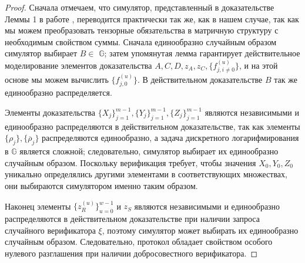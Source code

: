 \documentclass{article}
\theoremstyle{definition}
\begin{document}
\begin{proof}
Сначала отмечаем, что симулятор, представленный в доказательстве Леммы 1 в работе \cite{bootle}, переводится практически так же, как в нашем случае, так как мы можем преобразовать тензорные обязательства в матричную структуру с необходимым свойством суммы.
Сначала единообразно случайным образом симулятор выбирает $B \in$ \begin{math}\mathbb{G}\end{math}; затем упомянутая лемма гарантирует действительное моделирование элементов доказательства $A,C,D,z_A,z_C,\{f^{(u)}_{j,i \neq 0}\}$, и на этой основе мы можем вычислить $\{f^{(u)}_{j,0}\}$.
В действительном доказательстве $B$ так же единообразно распределяется.

Элементы доказательства $\{X_j\}_{j=1}^{m-1},\{Y_j\}_{j=1}^{m-1}, \{Z_j\}_{j=1}^{m-1}$ являются независимыми и единообразно распределяются в действительном доказательстве, так как элементы $\{\rho_j\},\{\overline{\rho}_j\}$ распределяются единообразно, а задача дискретного логарифмирования в \begin{math}\mathbb{G}\end{math} является сложной; следовательно, симулятор выбирает их единообразно случайным образом.
Поскольку верификация требует, чтобы значения $X_0,Y_0,Z_0$ уникально определялись другими элементами в соответствующих множествах, они выбираются симулятором именно таким образом.

Наконец элементы $\{z^{(u)}_R\}_{u=0}^{w-1}$ и $z_S$ являются независимыми и единообразно распределяются в действительном доказательстве при наличии запроса случайного верификатора $\xi$, поэтому симулятор может выбирать их единообразно случайным образом.
Следовательно, протокол обладает свойством  особого нулевого разглашения при наличии добросовестного верификатора.


\end{proof}
\end{document}
